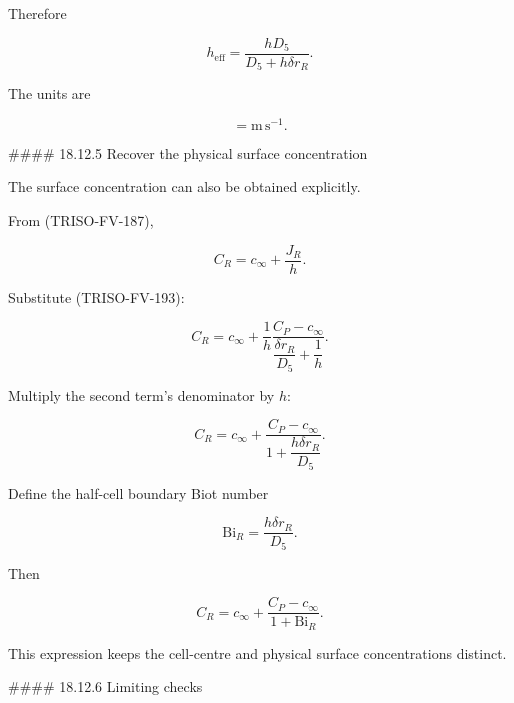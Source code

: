 \documentclass[11pt,a4paper]{article}
\begin{document}
Therefore

\begin{equation}
\boxed{
h_{\mathrm{eff}}
=
\frac{hD_5}{
D_5+h\delta r_R
}.
}
\tag{TRISO-FV-197}
\label{eq:triso-fv-197}
\end{equation}

The units are

\begin{equation}
[h_{\mathrm{eff}}]
=
\mathrm{m\,s^{-1}}.
\tag{TRISO-FV-198}
\label{eq:triso-fv-198}
\end{equation}

\#\#\#\# 18.12.5 Recover the physical surface concentration

The surface concentration can also be obtained explicitly.

From (TRISO-FV-187),

\begin{equation}
C_R
=
c_\infty+\frac{J_R}{h}.
\tag{TRISO-FV-199}
\label{eq:triso-fv-199}
\end{equation}

Substitute (TRISO-FV-193):

\begin{equation}
C_R
=
c_\infty
+
\frac1h
\frac{
C_P-c_\infty
}{
\dfrac{\delta r_R}{D_5}
+
\dfrac1h
}.
\tag{TRISO-FV-200}
\label{eq:triso-fv-200}
\end{equation}

Multiply the second term's denominator by $h$:

\begin{equation}
C_R
=
c_\infty
+
\frac{
C_P-c_\infty
}{
1+\dfrac{h\delta r_R}{D_5}
}.
\tag{TRISO-FV-201}
\label{eq:triso-fv-201}
\end{equation}

Define the half-cell boundary Biot number

\begin{equation}
\boxed{
\mathrm{Bi}_R
=
\frac{h\delta r_R}{D_5}.
}
\tag{TRISO-FV-202}
\label{eq:triso-fv-202}
\end{equation}

Then

\begin{equation}
\boxed{
C_R
=
c_\infty
+
\frac{
C_P-c_\infty
}{
1+\mathrm{Bi}_R
}.
}
\tag{TRISO-FV-203}
\label{eq:triso-fv-203}
\end{equation}

This expression keeps the cell-centre and physical surface concentrations distinct.

\#\#\#\# 18.12.6 Limiting checks
\end{document}
